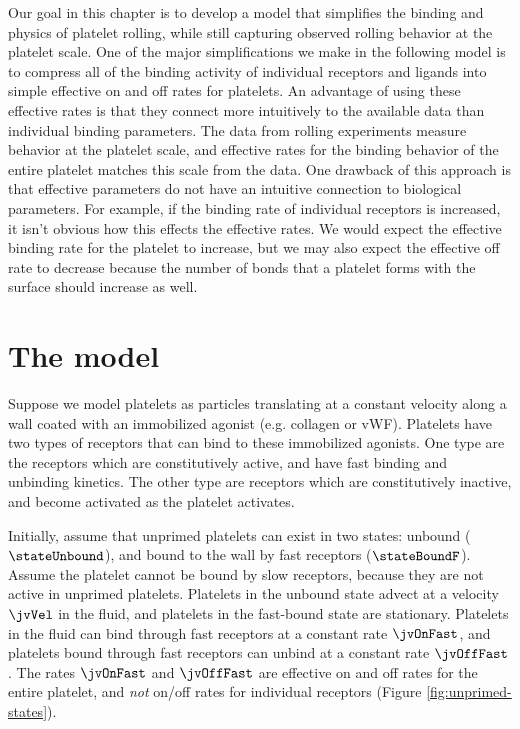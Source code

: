 Our goal in this chapter is to develop a model that simplifies the
binding and physics of platelet rolling, while still capturing
observed rolling behavior at the platelet scale. One of the major
simplifications we make in the following model is to compress all of
the binding activity of individual receptors and ligands into simple
effective on and off rates for platelets. An advantage of using these
effective rates is that they connect more intuitively to the available
data than individual binding parameters. The data from rolling
experiments measure behavior at the platelet scale, and effective
rates for the binding behavior of the entire platelet matches this
scale from the data. One drawback of this approach is that effective
parameters do not have an intuitive connection to biological
parameters. For example, if the binding rate of individual receptors
is increased, it isn't obvious how this effects the effective
rates. We would expect the effective binding rate for the platelet to
increase, but we may also expect the effective off rate to
decrease because the number of bonds that a platelet forms with the
surface should increase as well.

\section{The model}
\label{sec:jv-model}

Suppose we model platelets as particles translating at a constant
velocity along a wall coated with an immobilized agonist (e.g. collagen
or vWF). Platelets have two types of receptors that can bind to these
immobilized agonists. One type are the receptors which are
constitutively active, and have fast binding and unbinding kinetics. The
other type are receptors which are constitutively inactive, and become
activated as the platelet activates.

Initially, assume that unprimed platelets can exist in two states:
unbound ($\stateUnbound$), and bound to the wall by fast receptors
($\stateBoundF$). Assume the platelet cannot be bound by slow receptors,
because they are not active in unprimed platelets. Platelets in the
unbound state advect at a velocity $\jvVel$ in the fluid, and platelets
in the fast-bound state are stationary. Platelets in the fluid can bind
through fast receptors at a constant rate $\jvOnFast$, and platelets
bound through fast receptors can unbind at a constant rate
$\jvOffFast$. The rates $\jvOnFast$ and $\jvOffFast$ are effective on
and off rates for the entire platelet, and \emph{not} on/off rates for
individual receptors (Figure \ref{fig:unprimed-states}).

